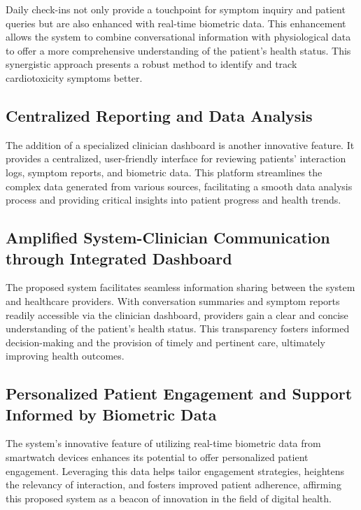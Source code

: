 \documentclass[11pt]{article}
\begin{document}
Daily check-ins not only provide a touchpoint for symptom inquiry and patient queries but are also enhanced with real-time biometric data. This enhancement allows the system to combine conversational information with physiological data to offer a more comprehensive understanding of the patient's health status. This synergistic approach presents a robust method to identify and track cardiotoxicity symptoms better.

\subsection{Centralized Reporting and Data Analysis}

The addition of a specialized clinician dashboard is another innovative feature. It provides a centralized, user-friendly interface for reviewing patients' interaction logs, symptom reports, and biometric data. This platform streamlines the complex data generated from various sources, facilitating a smooth data analysis process and providing critical insights into patient progress and health trends.

\subsection{Amplified System-Clinician Communication through Integrated Dashboard}

The proposed system facilitates seamless information sharing between the system and healthcare providers. With conversation summaries and symptom reports readily accessible via the clinician dashboard, providers gain a clear and concise understanding of the patient's health status. This transparency fosters informed decision-making and the provision of timely and pertinent care, ultimately improving health outcomes.

\subsection{Personalized Patient Engagement and Support Informed by Biometric Data}

The system's innovative feature of utilizing real-time biometric data from smartwatch devices enhances its potential to offer personalized patient engagement. Leveraging this data helps tailor engagement strategies, heightens the relevancy of interaction, and fosters improved patient adherence, affirming this proposed system as a beacon of innovation in the field of digital health.
\end{document}

